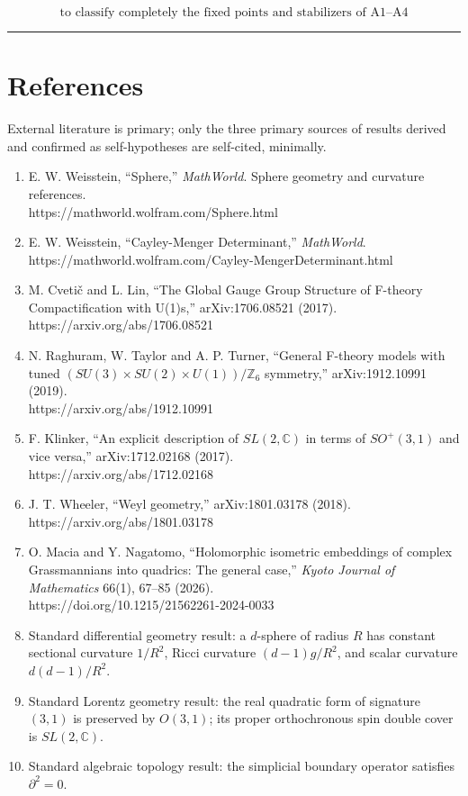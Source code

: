 \documentclass[
  a4paper,
]{article}
\begin{document}
\[
\boxed{
\text{to classify completely the fixed points and stabilizers of A1--A4}
}
\]

\begin{center}\rule{0.5\linewidth}{0.5pt}\end{center}

\section{References}\label{references}

External literature is primary; only the three primary sources of
results derived and confirmed as self-hypotheses are self-cited,
minimally.

\begin{enumerate}
\def\labelenumi{\arabic{enumi}.}
\item
  E. W. Weisstein, ``Sphere,'' \emph{MathWorld}. Sphere geometry and
  curvature references.\\
  https://mathworld.wolfram.com/Sphere.html
\item
  E. W. Weisstein, ``Cayley-Menger Determinant,'' \emph{MathWorld}.\\
  https://mathworld.wolfram.com/Cayley-MengerDeterminant.html
\item
  M. Cvetič and L. Lin, ``The Global Gauge Group Structure of F-theory
  Compactification with U(1)s,'' arXiv:1706.08521 (2017).\\
  https://arxiv.org/abs/1706.08521
\item
  N. Raghuram, W. Taylor and A. P. Turner, ``General F-theory models
  with tuned \((SU(3)\times SU(2)\times U(1))/\mathbb Z_6\) symmetry,''
  arXiv:1912.10991 (2019).\\
  https://arxiv.org/abs/1912.10991
\item
  F. Klinker, ``An explicit description of \(SL(2,\mathbb C)\) in terms
  of \(SO^+(3,1)\) and vice versa,'' arXiv:1712.02168 (2017).\\
  https://arxiv.org/abs/1712.02168
\item
  J. T. Wheeler, ``Weyl geometry,'' arXiv:1801.03178 (2018).\\
  https://arxiv.org/abs/1801.03178
\item
  O. Macia and Y. Nagatomo, ``Holomorphic isometric embeddings of
  complex Grassmannians into quadrics: The general case,'' \emph{Kyoto
  Journal of Mathematics} 66(1), 67--85 (2026).\\
  https://doi.org/10.1215/21562261-2024-0033
\item
  Standard differential geometry result: a \(d\)-sphere of radius \(R\)
  has constant sectional curvature \(1/R^2\), Ricci curvature
  \((d-1)g/R^2\), and scalar curvature \(d(d-1)/R^2\).
\item
  Standard Lorentz geometry result: the real quadratic form of signature
  \((3,1)\) is preserved by \(O(3,1)\); its proper orthochronous spin
  double cover is \(SL(2,\mathbb C)\).
\item
  Standard algebraic topology result: the simplicial boundary operator
  satisfies \(\partial^2=0\).
\end{enumerate}
\end{document}
